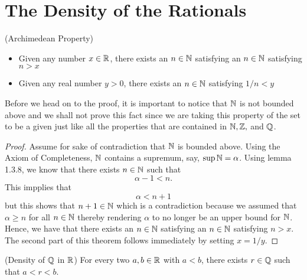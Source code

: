 % 


\section{The Density of the Rationals }

\begin{tcolorbox}
\begin{thm}(Archimedean Property)
    \begin{itemize}
        
        \item Given any number \( x \in \mathbb{R} \), there exists an \( n \in \mathbb{N} \) satisfying an \( n \in \mathbb{N} \) satisfying \( n > x \)
        \item Given any real number \( y > 0 \), there exists an \( n \in \mathbb{N} \) satisfying \( 1/n < y \)

    \end{itemize}
    
\end{thm}
\end{tcolorbox}

Before we head on to the proof, it is important to notice that \( \mathbb{N} \) is not bounded above and we shall not prove this fact since we are taking this property of the set to be a given just like all the properties that are contained in \( \mathbb{N}, \mathbb{Z},\)  and \( \mathbb{Q} \). 

\begin{proof}
    Assume for sake of contradiction that \( \mathbb{N} \) is bounded above. Using the Axiom of Completeness, \( \mathbb{N} \) contains a supremum, say, \( \sup \mathbb{N} = \alpha \). Using lemma 1.3.8, we know that there exists \( n \in \mathbb{N} \) such that 
    \[  \alpha - 1 < n \tag{\( \epsilon = 1 \)}.\]
    This impplies that 
    \[ \alpha < n + 1 \]
    but this shows that \( n+1 \in \mathbb{N} \) which is a contradiction because we assumed that \( \alpha \geq n \) for all \( n \in \mathbb{N} \) thereby rendering \( \alpha \) to no longer be an upper bound for \( \mathbb{N} \). Hence, we have that 
    there exists an \( n \in \mathbb{N} \) satisfying an \( n \in \mathbb{N} \) satisfying \( n > x \).
    The second part of this theorem follows immediately by setting \( x = 1/y \).
\end{proof}

\begin{tcolorbox}
    \begin{thm}(Density of \( \mathbb{Q} \) in \( \mathbb{R} \))
        For every two \( a,b \in \mathbb{R} \) with \( a < b \), there exists \( r \in \mathbb{Q} \) such that \( a < r < b \).
    \end{thm}
\end{tcolorbox}


